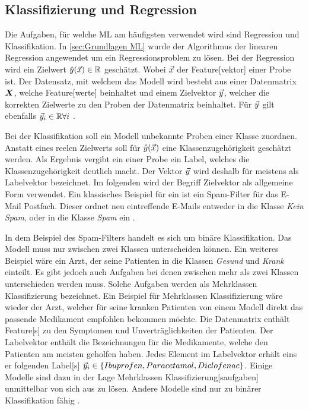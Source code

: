 \subsection{Klassifizierung und Regression} \label{sec:ML klass und Reg}
Die Aufgaben, für welche \gls{ML} am häufigsten verwendet wird sind Regression und \gls{Klassifikation}. In \ref{sec:Grundlagen ML} wurde der Algorithmus der linearen Regression angewendet um ein Regressionsproblem zu lösen. Bei der Regression wird ein Zielwert \(\hat{y}(\vec{x}) \in \mathbb{R}\) geschätzt. Wobei \(\vec{x}\) der \gls{Feature}[vektor] einer Probe ist. Der Datensatz, mit welchem das Modell  wird besteht aus einer \gls{Datenmatrix} \(\boldsymbol{X}\), welche \gls{Feature}[werte] beinhaltet und einem \gls{Zielvektor} \(\vec{y}\), welcher die korrekten Zielwerte zu den Proben der \gls{Datenmatrix} beinhaltet. Für \(\vec{y}\) gilt ebenfalls \(\vec{y}_i \in \mathbb{R} \forall i \) \cite{Burkov.2019, ShalevShwartz.2014}. \par

Bei der \gls{Klassifikation} soll ein Modell unbekannte Proben einer Klasse zuordnen. Anstatt eines reelen Zielwerts soll für \(\hat{y}(\vec{x})\) eine Klassenzugehörigkeit geschätzt werden. Als Ergebnis vergibt ein  einer Probe ein \gls{Label}, welches die Klassenzugehörigkeit deutlich macht. Der Vektor \(\vec{y}\) wird deshalb für  meistens als \gls{Labelvektor} bezeichnet. Im folgenden wird der Begriff \gls{Zielvektor} als allgemeine Form verwendet. Ein klassisches Beispiel für ein  ist ein Spam-Filter für das E-Mail Postfach. Dieser ordnet neu eintreffende E-Mails entweder in die Klasse \textit{Kein Spam}, oder in die Klasse \textit{Spam} ein \cite{Burkov.2019}. \par

In dem Beispiel des Spam-Filters handelt es sich um binäre \gls{Klassifikation}. Das Modell muss nur zwischen zwei Klassen unterscheiden können. Ein weiteres Beispiel wäre ein Arzt, der seine Patienten in die Klassen \textit{Gesund} und \textit{Krank} einteilt. Es gibt jedoch auch Aufgaben bei denen zwischen mehr als zwei Klassen unterschieden werden muss. Solche Aufgaben werden als \gls{Mehrklassen Klassifizierung} bezeichnet. Ein Beispiel für \gls{Mehrklassen Klassifizierung} wäre wieder der Arzt, welcher für seine kranken Patienten von einem Modell direkt das passende Medikament empfohlen bekommen möchte. Die \gls{Datenmatrix} enthält \gls{Feature}[s] zu den Symptomen und Unverträglichkeiten der Patienten. Der \gls{Labelvektor} enthält die Bezeichnungen für die Medikamente, welche den Patienten am meisten geholfen haben. Jedes Element im \gls{Labelvektor} erhält eins er folgenden \gls{Label}[s] \(\vec{y}_i \in \{Ibuprofen, Paracetamol, Diclofenac\}\). Einige Modelle sind dazu in der Lage \gls{Mehrklassen Klassifizierung}[saufgaben] unmittelbar von sich aus zu lösen. Andere Modelle sind nur zu binärer \gls{Klassifikation} fähig \cite{Burkov.2019}.\par

